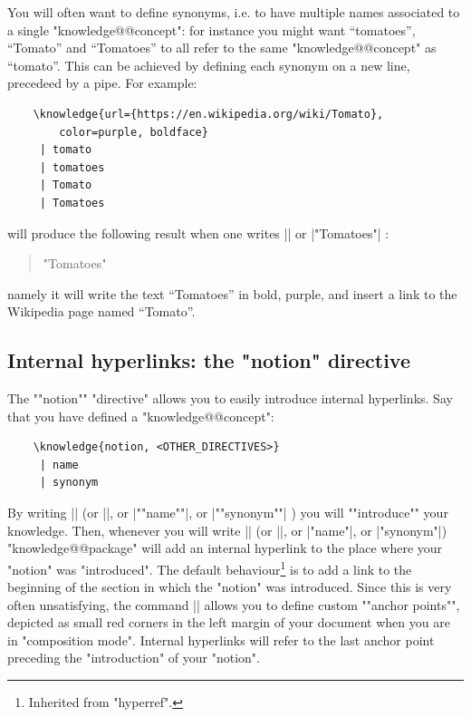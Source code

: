 \documentclass{article}
\begin{document}
You will often want to define synonyms, i.e. to have multiple names associated to a single "knowledge@@concept": for instance you might want ``tomatoes'', ``Tomato'' and  ``Tomatoes'' to all refer to the same "knowledge@@concept" as ``tomato''. This can be achieved by defining each synonym on a new line, precedeed by a pipe. For example:
\begin{verbatim}
    \knowledge{url={https://en.wikipedia.org/wiki/Tomato},
        color=purple, boldface}
     | tomato
     | tomatoes
     | Tomato
     | Tomatoes
\end{verbatim}
will produce the following result when one writes \spverb|| or
%
\spverb|"Tomatoes"|%
:%
\begin{quote}
    "Tomatoes"
\end{quote}
namely it will write the text ``Tomatoes'' in bold, purple, and insert a link to the Wikipedia page named ``Tomato''.


\subsection{Internal hyperlinks: the "notion" directive}

The ""notion"" "directive" allows you to easily introduce internal hyperlinks.
Say that you have defined a "knowledge@@concept":
\begin{verbatim}
    \knowledge{notion, <OTHER_DIRECTIVES>}
     | name
     | synonym
\end{verbatim}
By writing \spverb|| (or
\spverb||, or 
%
\spverb|""name""|, or \spverb|""synonym""|%
) you will \AP""introduce"" your knowledge. Then, whenever you will write
\spverb|| (or
\spverb||, or 
%
\spverb|"name"|, or \spverb|"synonym"|)%
"knowledge@@package" will add an internal hyperlink to the place where
your "notion" was "introduced". The default behaviour\footnote{Inherited from
"hyperref".} is to add a link to the beginning of the section in which the "notion" was introduced. Since this is very often unsatisfying, the command
\spverb|\AP| allows you to define custom \AP""anchor points"", depicted as 
small red corners in the left margin of your document when you are in "composition mode".
Internal hyperlinks 
will refer to the last anchor point preceding the "introduction" of your 
"notion".
\end{document}
